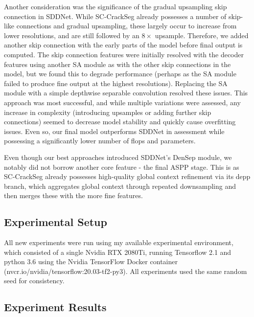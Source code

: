 \documentclass[a4paper,12pt]{report}
\begin{document}
Another consideration was the significance of the gradual upsampling skip connection in SDDNet. While SC-CrackSeg already possesses a number of skip-like connections and gradual upsampling, these largely occur to increase from lower resolutions, and are still followed by an $8 \times$ upsample. Therefore, we added another skip connection with the early parts of the model before final output is computed. The skip connection features were initially resolved with the decoder features using another SA module as with the other skip connections in the model, but we found this to degrade performance (perhaps as the SA module failed to produce fine output at the highest resolutions). Replacing the SA module with a simple depthwise separable convolution resolved these issues. This approach was most successful, and while multiple variations were assessed, any increase in complexity (introducing upsamples or adding further skip connections) seemed to decrease model stability and quickly cause overfitting issues. Even so, our final model outperforms SDDNet in assessment while possessing a significantly lower number of flops and parameters.%



Even though our best approaches introduced SDDNet's DenSep module, we notably did not borrow another core feature - the final ASPP stage. This is as SC-CrackSeg already possesses high-quality global context refinement via its depp branch, which aggregates global context through repeated downsampling and then merges these with the more fine features.

\subsection{Experimental Setup}
All new experiments were run using my available experimental environment, which consisted of a single Nvidia RTX 2080Ti, running Tensorflow 2.1 and python 3.6 using the Nvidia TensorFlow Docker container (nvcr.io/nvidia/tensorflow:20.03-tf2-py3). All experiments used the same random seed for consistency.

\subsection{Experiment Results}
\end{document}

